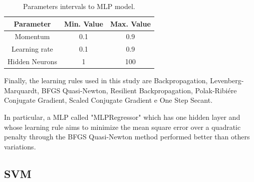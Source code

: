\begin{table}[h]
\caption{Parameters intervals to MLP model.}\label{tab:mlp_configuration_investigation} \centering
\begin{tabular}{|c|c|c|}
  \hline
  Parameter & Min. Value & Max. Value \\
  \hline
  Momentum & 0.1 & 0.9 \\
  \hline
  Learning rate & 0.1 & 0.9 \\
  \hline
  Hidden Neurons & 1 & 100 \\
  \hline
\end{tabular}
\end{table}

Finally, the learning rules used in this study are Backpropagation, Levenberg-Marquardt, BFGS Quasi-Newton, Resilient Backpropagation, Polak-Ribiére Conjugate Gradient, Scaled Conjugate Gradient e One Step Secant.

In particular, a MLP called "MLPRegressor" which has one hidden layer and whose learning rule aims to minimize the mean square error over a quadratic penalty through the BFGS Quasi-Newton method performed better than others variations.

\subsection{SVM}

